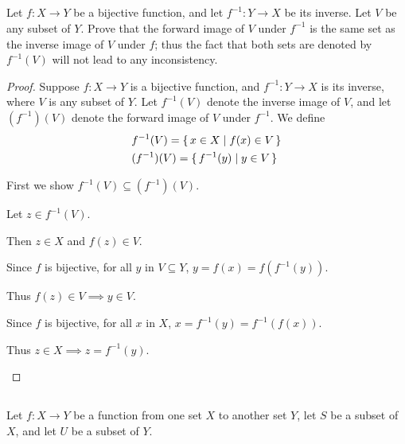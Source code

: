 \documentclass[../../main.tex]{subfiles}
\begin{document}

\subsection{}
\begin{q}
    Let $f \colon X \to Y$ be a bijective function, and let $f^{-1} \colon Y \to X$ be its inverse. Let $V$ be any subset of $Y$. Prove that the forward image of $V$ under $f^{-1}$ is the same set as the inverse image of $V$ under $f$; thus the fact that both sets are denoted by $f^{-1}(V)$ will not lead to any inconsistency.
\end{q}
    
\begin{proof}
    Suppose $f \colon X \to Y$ is a bijective function, and $f^{-1} \colon Y \to X$ is its inverse, where $V$ is any subset of $Y$.
    Let $f^{-1}(V)$ denote the inverse image of $V$, and let $(f^{-1})(V)$ denote the forward image of $V$ under $f^{-1}$.
    We define
    \begin{equation*}
    \begin{aligned}
        & f^{-1}(V) = \{\,x \in X\mid f(x) \in V\,\} \\
        & (f^{-1})(V) = \{\,f^{-1}(y)\mid y \in V\,\}
    \end{aligned}
    \end{equation*}

    \begin{linebyline}
            \item First we show $f^{-1}(V) \subseteq (f^{-1})(V)$.
            \item Let $z \in f^{-1}(V)$. 
            \item Then $z \in X$ and $f(z) \in V$. 
            \item Since $f$ is bijective, for all $y$ in $V \subseteq Y$, $y = f(x) = f(f^{-1}(y))$.
            \item Thus $f(z) \in V \implies y \in V$. 
            \item Since $f$ is bijective, for all $x$ in $X$, $x = f^{-1}(y) = f^{-1}(f(x))$.
            \item Thus $z \in X \implies z = f^{-1}(y)$. 
    \end{linebyline}
\end{proof}

\subsection{}
\begin{q}
    Let $f \colon X \to Y$ be a function from one set $X$ to another set $Y$, let $S$ be a subset of $X$, and let $U$ be a subset of $Y$.
\end{q}
\end{document}
